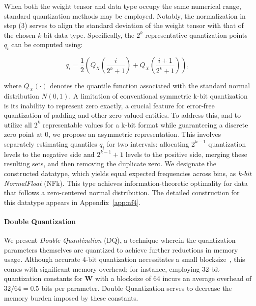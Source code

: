When both the weight tensor and data type occupy the same numerical range, standard quantization methods may be employed. Notably, the normalization in step (3) serves to align the standard deviation of the weight tensor with that of the chosen $k$-bit data type. Specifically, the $2^k$ representative quantization points $q_i$ can be computed using:

\begin{equation}
q_i  = \frac{1}{2}\left( Q_X\left(\frac{i}{2^k+1}\right) + Q_X\left(\frac{i+1}{2^k+1}\right)\right),
\end{equation}

where $Q_X(\cdot)$ denotes the quantile function associated with the standard normal distribution $N(0,1)$. A limitation of conventional symmetric k-bit quantization is its inability to represent zero exactly, a crucial feature for error-free quantization of padding and other zero-valued entities. To address this, and to utilize all $2^k$ representable values for a k-bit format while guaranteeing a discrete zero point at $0$, we propose an asymmetric representation. This involves separately estimating quantiles $q_i$ for two intervals: allocating $2^{k-1}$ quantization levels to the negative side and $2^{k-1}+1$ levels to the positive side, merging these resulting sets, and then removing the duplicate zero. We designate the constructed datatype, which yields equal expected frequencies across bins, as \emph{k-bit NormalFloat} (NFk). This type achieves information-theoretic optimality for data that follows a zero-centered normal distribution. The detailed construction for this datatype appears in Appendix~\ref{app:nf4}.

\paragraph{Double Quantization{}} 
We present \emph{Double Quantization} (DQ), a technique wherein the quantization parameters themselves are quantized to achieve further reductions in memory usage. Although accurate 4-bit quantization necessitates a small blocksize~\citep{dettmers2022case}, this comes with significant memory overhead; for instance, employing 32-bit quantization constants for $\mathbf{W}$ with a blocksize of 64 incurs an average overhead of $32/64 = 0.5$ bits per parameter. Double Quantization serves to decrease the memory burden imposed by these constants.

